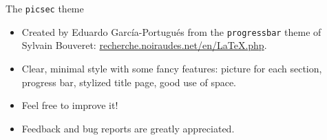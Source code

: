 \documentclass[xcolor={svgnames,dvipsnames}]{beamer}
\author{Eduardo Garc\'ia-Portugu\'es \normalfont(egarcia@math.ku.dk),\\
based on the code of Sylvain Bouveret.\\[0.25cm]
University of Copenhagen\\
\mbox{}}
\date{Copenhagen, February, 2015}
\begin{document}
\begin{frame}
\titlepage
\end{frame}

\begin{frame}{The \texttt{picsec} theme}

\begin{itemize}

\item Created by Eduardo Garc\'ia-Portugu\'es from the \texttt{progressbar} theme of Sylvain Bouveret: \textcolor{blue}{\url{recherche.noiraudes.net/en/LaTeX.php}}.

\item Clear, minimal style with some fancy features: picture for each section, progress bar, stylized title page, good use of space.

\item Feel free to improve it!

\item Feedback and bug reports are greatly appreciated.

\end{itemize}

\end{frame}

%
%
%
%
%
%
%
%
%

\end{document}

